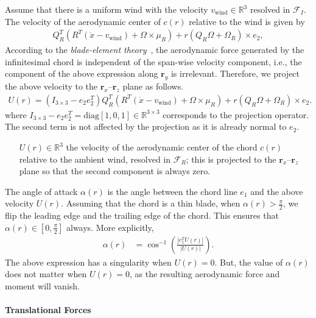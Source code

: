 \documentclass[10pt]{article}
\renewcommand{\Re}{\ensuremath{\mathbb{R}}}
\begin{document}
Assume that there is a uniform wind with the velocity $v_{\mathrm{wind}}\in\Re^3$ resolved in $\mathcal{F}_I$. 
The velocity of the aerodynamic center of $c(r)$ relative to the wind is given by
\begin{align*}
    Q_R^T( R^T (\dot x-v_{\mathrm{wind}}) + \Omega\times \mu_R ) + r  (Q_R\Omega + \Omega_R )\times e_2,
\end{align*}
According to the \textit{blade-element theory}~\cite{ellington1984aerodynamics}, the aerodynamic force generated by the infinitesimal chord is independent of the span-wise velocity component, i.e., the component of the above expression along $\mathbf{r}_y$ is irrelevant. 
Therefore, we project the above velocity to the $\mathbf{r}_x$--$\mathbf{r}_z$ plane as follows.
\begin{align}
    U(r) = (I_{3\times 3}- e_2 e_2^T) Q_R^T( R^T (\dot x-v_{\mathrm{wind}}) + \Omega\times \mu_R ) + r  (Q_R\Omega + \Omega_R )\times e_2.
\end{align}
where $I_{3\times 3} - e_2e_2^T= \mathrm{diag}[1,0,1]\in\Re^{3\times 3}$ corresponds to the projection operator. 
The second term is not affected by the projection as it is already normal to $e_2$.
\begin{itemize}[leftmargin=2.5cm]
    \item[$U(r)\in\Re^3$]  the velocity of the aerodynamic center of the chord $c(r)$ relative to the ambient wind, resolved in $\mathcal{F}_R$; this is projected to the $\mathbf{r}_x$--$\mathbf{r}_z$ plane so that the second component is always zero. 
\end{itemize}

The angle of attack $\alpha(r)$ is the angle between the chord line $e_1$ and the above velocity $U(r)$. 
Assuming that the chord is a thin blade, when $\alpha(r)>\frac{\pi}{2}$, we flip the leading edge and the trailing edge of the chord.
This ensures that $\alpha(r)\in[0,\frac{\pi}{2}]$ always. 
More explicitly, 
\begin{align}
    \alpha (r) & = 
        \cos^{-1} ( \frac{|e_1^T U(r)|}{|U(r)|} ).
\end{align}
The above expression has a singularity when $U(r)=0$. 
But, the value of $\alpha(r)$ does not matter when $U(r)=0$, as the resulting aerodynamic force and moment will vanish.

\paragraph{Translational Forces}
\end{document}
